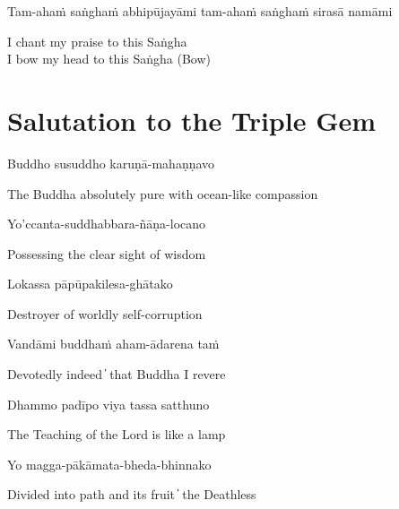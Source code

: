Tam-ahaṁ saṅghaṁ abhipūjayāmi tam-ahaṁ saṅghaṁ sirasā namāmi

\begin{cprenglish}
  I chant my praise to this Saṅgha\\
  I bow my head to this Saṅgha (Bow)
\end{cprenglish}


\section{Salutation to the Triple Gem}

\begin{leader}
\end{leader}
\begin{leader}
\end{leader}


Buddho susuddho karuṇā-mahaṇṇavo

\begin{cprenglish}
  The Buddha absolutely pure with ocean-like compassion
\end{cprenglish}

Yo'ccanta-suddhabbara-ñāṇa-locano

\begin{cprenglish}
  Possessing the clear sight of wisdom
\end{cprenglish}

Lokassa pāpūpakilesa-ghātako

\begin{cprenglish}
  Destroyer of worldly self-corruption
\end{cprenglish}

Vandāmi buddhaṁ aham-ādarena taṁ

\begin{cprenglish}
  Devotedly indeed  ̓  that Buddha I revere
\end{cprenglish}

Dhammo padīpo viya tassa satthuno

\begin{cprenglish}
  The Teaching of the Lord is like a lamp
\end{cprenglish}

Yo magga-pākāmata-bheda-bhinnako

\begin{cprenglish}
  Divided into path and its fruit  ̓  the Deathless
\end{cprenglish}

